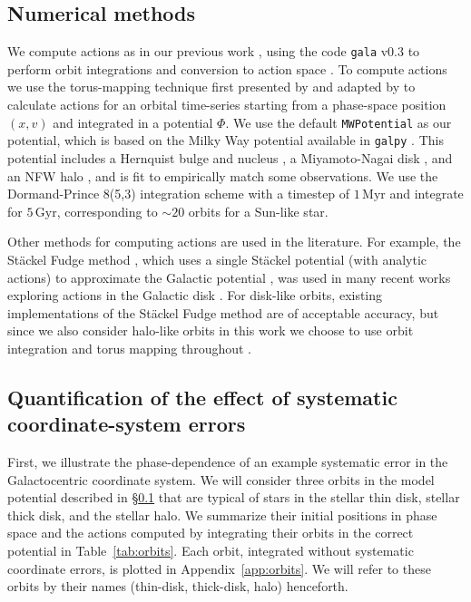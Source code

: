 \documentclass[twocolumn]{aastex62}
\newcommand{\Myr}{\text{Myr}}
\newcommand{\Gyr}{\text{Gyr}}
\begin{document}
\subsection{Numerical methods} \label{ssec:action_comp}
We compute actions as in our previous work \citep{2018ApJ...867...31B}, using the code \texttt{gala} v0.3 to perform orbit integrations and
conversion to action space \citep{2017JOSS....2..388P,Price-Whelan:2018}.
To compute actions we use the torus-mapping technique first presented by \citet{1990MNRAS.244..634M} and adapted by \citet{2014MNRAS.441.3284S} to calculate actions for an orbital time-series starting from a phase-space position $(x, v)$ and integrated in a potential $\Phi$. We use the default \texttt{MWPotential} as our
potential, which is based on the Milky Way potential available in
\texttt{galpy} \citep{2015ApJS..216...29B}. This potential includes a
Hernquist bulge and nucleus \citep{1990ApJ...356..359H}, a Miyamoto-Nagai disk
\citep{1975PASJ...27..533M}, and an NFW halo \citep{1997ApJ...490..493N}, and
is fit to empirically match some observations. We use the Dormand-Prince
8(5,3) integration scheme \citep{Dormand80:integrator} with a timestep of
$1\,\Myr$ and integrate for $5\,\Gyr$, corresponding to $\sim 20$ orbits for a
Sun-like star.

Other methods for computing actions are used in the literature. For example,
the St\"ackel Fudge method \citep{2016MNRAS.457.2107S}, which uses a single
St\"ackel potential (with analytic actions) to approximate the Galactic potential
\citep{1985MNRAS.216..273D,2012MNRAS.426.1324B}, was used in many recent works exploring actions in the Galactic disk
\citep[e.g.][]{2018arXiv180503653T,2018MNRAS.481.4093S,2018arXiv180803278T}. For
disk-like orbits, existing implementations of the St\"ackel Fudge method are of acceptable
accuracy, but since we also consider halo-like orbits in this work we choose to use
orbit integration and torus mapping throughout \citep{2016MNRAS.457.2107S}.

\subsection{Quantification of the effect of systematic coordinate-system errors} \label{ssec:quant}
First, we illustrate the phase-dependence of an example systematic error in the Galactocentric coordinate system. We will consider three orbits in the model potential described in \S \ref{ssec:action_comp} that are typical of stars in the
stellar thin disk, stellar thick disk, and the stellar halo. We summarize
their initial positions in phase space and the actions computed by integrating their
orbits in the correct potential in Table~\ref{tab:orbits}. Each orbit, integrated without systematic coordinate errors, is plotted in
Appendix~\ref{app:orbits}. We will refer to these orbits by their names (thin-disk, thick-disk, halo)
henceforth.
\end{document}
